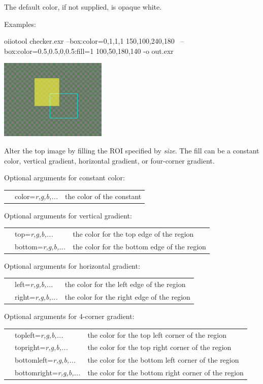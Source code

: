 The default color, if not supplied, is opaque white.

\noindent Examples:

\begin{code}
    oiiotool checker.exr --box:color=0,1,1,1 150,100,240,180 \
                 --box:color=0.5,0.5,0,0.5:fill=1 100,50,180,140 -o out.exr
\end{code}
\spc \includegraphics[width=2in]{figures/box.png}  \\
\apiend


Alter the top image by filling the ROI specified by \emph{size}.
The fill can be a constant color, vertical gradient, horizontal gradient,
or four-corner gradient.

Optional arguments for constant color: \\
\begin{tabular}{p{10pt} p{1.5in} p{3.75in}}
 & {\cf color=}\emph{r,g,b,...} & the color of the constant \\
\end{tabular}

Optional arguments for vertical gradient: \\
\begin{tabular}{p{10pt} p{1.5in} p{3.75in}}
 & {\cf top=}\emph{r,g,b,...}    & the color for the top edge of the region \\
 & {\cf bottom=}\emph{r,g,b,...} & the color for the bottom edge of the region \\
\end{tabular}

Optional arguments for horizontal gradient: \\
\begin{tabular}{p{10pt} p{1.5in} p{3.75in}}
 & {\cf left=}\emph{r,g,b,...}  & the color for the left edge of the region \\
 & {\cf right=}\emph{r,g,b,...} & the color for the right edge of the region \\
\end{tabular}

Optional arguments for 4-corner gradient: \\
\begin{tabular}{p{10pt} p{1.5in} p{3.75in}}
 & {\cf topleft=}\emph{r,g,b,...}     & the color for the top left corner of the region \\
 & {\cf topright=}\emph{r,g,b,...}    & the color for the top right corner of the region \\
 & {\cf bottomleft=}\emph{r,g,b,...}  & the color for the bottom left corner of the region \\
 & {\cf bottomright=}\emph{r,g,b,...} & the color for the bottom right corner of the region \\
\end{tabular}


